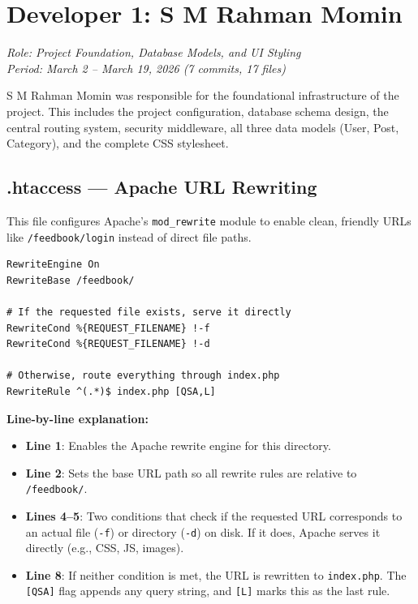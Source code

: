 \documentclass[12pt,a4paper]{report}
\begin{document}
\chapter{Developer 1: S M Rahman Momin}
\textit{Role: Project Foundation, Database Models, and UI Styling}\\
\textit{Period: March 2 -- March 19, 2026 (7 commits, 17 files)}

S M Rahman Momin was responsible for the foundational infrastructure of the project. This includes the project configuration, database schema design, the central routing system, security middleware, all three data models (User, Post, Category), and the complete CSS stylesheet.

\section{.htaccess --- Apache URL Rewriting}
This file configures Apache's \texttt{mod\_rewrite} module to enable clean, friendly URLs like \texttt{/feedbook/login} instead of direct file paths.

\begin{lstlisting}[language={}]
RewriteEngine On
RewriteBase /feedbook/

# If the requested file exists, serve it directly
RewriteCond %{REQUEST_FILENAME} !-f
RewriteCond %{REQUEST_FILENAME} !-d

# Otherwise, route everything through index.php
RewriteRule ^(.*)$ index.php [QSA,L]
\end{lstlisting}

\textbf{Line-by-line explanation:}
\begin{itemize}
    \item \textbf{Line 1}: Enables the Apache rewrite engine for this directory.
    \item \textbf{Line 2}: Sets the base URL path so all rewrite rules are relative to \texttt{/feedbook/}.
    \item \textbf{Lines 4--5}: Two conditions that check if the requested URL corresponds to an actual file (\texttt{-f}) or directory (\texttt{-d}) on disk. If it does, Apache serves it directly (e.g., CSS, JS, images).
    \item \textbf{Line 8}: If neither condition is met, the URL is rewritten to \texttt{index.php}. The \texttt{[QSA]} flag appends any query string, and \texttt{[L]} marks this as the last rule.
\end{itemize}
\end{document}
